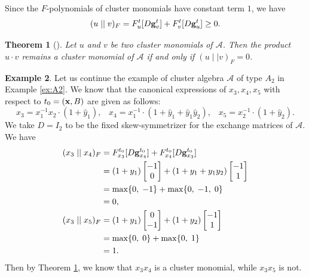 \documentclass[10pt]{amsart}
\newtheorem{theorem}{Theorem}[section]
\theoremstyle{definition}
\newtheorem{example}[theorem]{Example}
\theoremstyle{remark}
\numberwithin{equation}{section}
\begin{document}
Since the $F$-polynomials of cluster monomials have constant term $1$, we have \[(u\mid\mid v)_F=F_u^t[D{\bf g}_{v}^t]+F_{v}^t[D{\bf g}_{u}^t]\geq 0.\]
\begin{theorem}[{\cite[Theorem 4.19]{Cao-2023}}]
\label{thm:F-compatible}
     Let $u$ and $v$ be two cluster monomials of $\mathcal A$. Then the product $u\cdot v$ remains a cluster monomial of $\mathcal A$ if and only if $(u\mid\mid v)_F=0$.
\end{theorem}

\begin{example}
Let us continue the example of cluster algebra $\mathcal A$  of type $A_2$ in Example \ref{ex:A2}. We know that 
the canonical expressions of $x_3,x_4,x_5$ with respect to  $t_0=({\bf x}, B)$ are given as follows:
\[x_3={x_1^{-1}x_2\cdot(1+\widehat y_1),}\;\;\;  x_4={x_1^{-1}\cdot (1+\widehat y_1+\widehat y_1\widehat y_2),}\;\;\;
    x_5={x_2^{-1}\cdot (1+\widehat y_2)}.\]
  We take $D=I_2$ to be the fixed skew-symmetrizer for the exchange matrices of $\mathcal A$. We have
\begin{align}
    (x_3\mid\mid x_4)_F&=F_{x_3}^{t_0}[D{\bf g}_{x_4}^{t_0}]+F_{x_4}^{t_0}[D{\bf g}_{x_3}^{t_0}]\nonumber\\
    &=(1+y_1)\begin{bmatrix}
        -1\\0
    \end{bmatrix}+(1+y_1+y_1y_2)\begin{bmatrix}
        -1\\
        1
    \end{bmatrix}\nonumber\\
    &=\max\{0,\;-1\}+\max\{0,\;-1,\;0\}\nonumber\\
    &=0,\nonumber\\
    (x_3\mid\mid x_5)_F&=(1+y_1)\begin{bmatrix}
        0\\
        -1
    \end{bmatrix}+(1+y_2)\begin{bmatrix}
        -1\\
        1
    \end{bmatrix}\nonumber\\
    &=\max\{0,\;0\}+\max\{0,\;1\}\nonumber\\
    &=1.\nonumber
\end{align}
Then by Theorem \ref{thm:F-compatible}, we know that $x_3x_4$ is a cluster monomial, while $x_3x_5$ is not.
\end{example}
\end{document}
